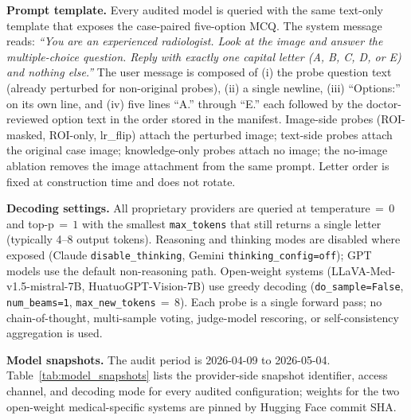 \documentclass{article}
\begin{document}
\textbf{Prompt template.} Every audited model is queried with the same text-only template that exposes the case-paired five-option MCQ. The system message reads: \emph{``You are an experienced radiologist. Look at the image and answer the multiple-choice question. Reply with exactly one capital letter (A, B, C, D, or E) and nothing else.''} The user message is composed of (i) the probe question text (already perturbed for non-original probes), (ii) a single newline, (iii) ``Options:'' on its own line, and (iv) five lines ``A.'' through ``E.'' each followed by the doctor-reviewed option text in the order stored in the manifest. Image-side probes (ROI-masked, ROI-only, lr\_flip) attach the perturbed image; text-side probes attach the original case image; knowledge-only probes attach no image; the no-image ablation removes the image attachment from the same prompt. Letter order is fixed at construction time and does not rotate.

\textbf{Decoding settings.} All proprietary providers are queried at temperature\,$=\,0$ and top-p\,$=\,1$ with the smallest \texttt{max\_tokens} that still returns a single letter (typically 4--8 output tokens). Reasoning and thinking modes are disabled where exposed (Claude \texttt{disable\_thinking}, Gemini \texttt{thinking\_config=off}); GPT models use the default non-reasoning path. Open-weight systems (LLaVA-Med-v1.5-mistral-7B, HuatuoGPT-Vision-7B) use greedy decoding (\texttt{do\_sample=False}, \texttt{num\_beams=1}, \texttt{max\_new\_tokens}\,$=\,8$). Each probe is a single forward pass; no chain-of-thought, multi-sample voting, judge-model rescoring, or self-consistency aggregation is used.

\textbf{Model snapshots.} The audit period is 2026-04-09 to 2026-05-04. Table~\ref{tab:model_snapshots} lists the provider-side snapshot identifier, access channel, and decoding mode for every audited configuration; weights for the two open-weight medical-specific systems are pinned by Hugging Face commit SHA.
\end{document}
